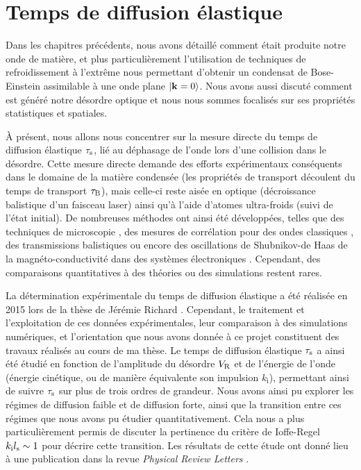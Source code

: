 \chapter{Temps de diffusion élastique}
\label{ch:TauS_PRL}

Dans les chapitres précédents, nous avons détaillé comment était produite notre onde de matière, et plus particulièrement l'utilisation de techniques de refroidissement à l'extrême nous permettant d'obtenir un condensat de Bose-Einstein assimilable à une onde plane $\left| \mathbf{k}=0 \right\rangle$. Nous avons aussi discuté comment est généré notre désordre optique et nous nous sommes focalisés sur ses propriétés statistiques et spatiales.

À présent, nous allons nous concentrer sur la mesure directe du temps de diffusion élastique $\tau_{\mathrm{s}}$, lié au déphasage de l'onde lors d'une collision dans le désordre. Cette mesure directe demande des efforts expérimentaux conséquents dans le domaine de la matière condensée (les propriétés de transport découlent du temps de transport $\tau_{\mathrm{B}}$), mais celle-ci reste aisée en optique (décroissance balistique d'un faisceau laser) ainsi qu'à l'aide d'atomes ultra-froids (suivi de l'état initial). De nombreuses méthodes ont ainsi été développées, telles que des techniques de microscopie \citep{jacques2012reflectance}\citep{martin2016determination}, des mesures de corrélation pour des ondes classiques \citep{sebbah2002spatial}\citep{hildebrand2014observation}\citep{obermann2014measuring}, des transmissions balistiques \citep{page1996group}\citep{savo2017observation} ou encore des oscillations de Shubnikov-de Haas de la magnéto-conductivité dans des systèmes électroniques \citep{niederer1974magneto}\citep{bockelmann1990single}\citep{monteverde2010transport}. Cependant, des comparaisons quantitatives à des théories ou des simulations restent rares.




La détermination expérimentale du temps de diffusion élastique a été réalisée en 2015 lors de la thèse de Jérémie Richard \citep{richard2015propagation}. Cependant, le traitement et l'exploitation de ces données expérimentales, leur comparaison à des simulations numériques, et l'orientation que nous avons donnée à ce projet constituent des travaux réalisés au cours de ma thèse. Le temps de diffusion élastique $\tau_{\mathrm{s}}$ a ainsi été étudié en fonction de l'amplitude du désordre $V_{\mathrm{R}}$ et de l'énergie de l'onde (énergie cinétique, ou de manière équivalente son impulsion $k_{\mathrm{i}}$), permettant ainsi de suivre $\tau_{\mathrm{s}}$ sur plus de trois ordres de grandeur. Nous avons ainsi pu explorer les régimes de diffusion faible et de diffusion forte, ainsi que la transition entre ces régimes que nous avons pu étudier quantitativement. Cela nous a plus particulièrement permis de discuter la pertinence du critère de Ioffe-Regel $k_{\mathrm{i}}l_{\mathrm{s}}\sim 1 $ pour décrire cette transition. Les résultats de cette étude ont donné lieu à une publication dans la revue \emph{Physical Review Letters} \citep{richard2019elastic}.




